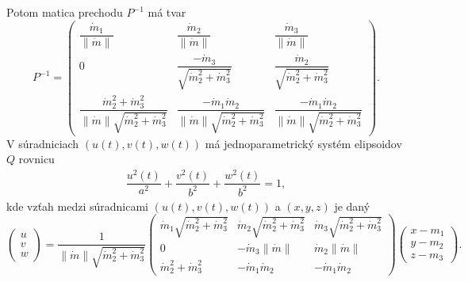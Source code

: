 Potom matica prechodu $P^{-1}$ má tvar
$$
P^{-1} = \left( \begin{matrix} \dfrac{\dot{m}_1}{\|\dot{m}\|} & \dfrac{\dot{m}_2}{\|\dot{m}\|} & \dfrac{\dot{m}_3}{\|\dot{m}\|} \\
0 & \dfrac{-\dot{m}_3}{\sqrt{\dot{m}_2^2 + \dot{m}_3^2}} & \dfrac{\dot{m}_2}{\sqrt{\dot{m}_2^2 + \dot{m}_3^2}} \\
\dfrac{\dot{m}_2^2 + \dot{m}_3^2}{\|\dot{m}\| \sqrt{\dot{m}_2^2 + \dot{m}_3^2}} & \dfrac{-\dot{m}_1 \dot{m}_2 }{\|\dot{m}\| \sqrt{\dot{m}_2^2 + \dot{m}_3^2}} &  \dfrac{-\dot{m}_1 \dot{m}_2}{ \|\dot{m}\| \sqrt{\dot{m}_2^2 + \dot{m}_3^2}} 
\end{matrix} \right).
$$
V súradniciach $(u(t),v(t),w(t))$ má jednoparametrický systém elipsoidov $Q$ rovnicu
\begin{align*}
\dfrac{u^2(t)}{a^2} + \dfrac{v^2(t)}{b^2} + \dfrac{w^2(t)}{b^2} = 1,
\end{align*}
kde vzťah medzi súradnicami $(u(t),v(t),w(t))$ a $(x,y,z)$ je daný
$$
\left(\begin{matrix}
u \\
v \\
w
\end{matrix}\right) = \frac{1}{ \| \dot{m}\| \sqrt{\dot{m}_2^2 + \dot{m}_3^2}}
\left( \begin{matrix} 
\dot{m}_1 \sqrt{\dot{m}_2^2 + \dot{m}_3^2} & \dot{m}_2 \sqrt{\dot{m}_2^2 + \dot{m}_3^2} & \dot{m}_3 \sqrt{\dot{m}_2^2 + \dot{m}_3^2} \\
0 & -\dot{m}_3 \| \dot{m}\| & \dot{m}_2 \| \dot{m}\| \\
\dot{m}_2^2 + \dot{m}_3^2 & -\dot{m}_1 \dot{m}_2 & -\dot{m}_1 \dot{m}_2 
\end{matrix} \right)
\left(\begin{matrix} x - m_1 \\ y - m_2 \\ z - m_3 \end{matrix}\right).
$$

